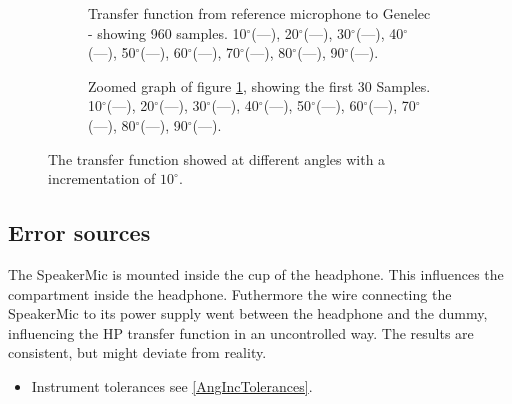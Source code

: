 \begin{figure}[H]
	\centering
	\begin{subfigure}[b]{\textwidth}
	
	\caption{Transfer function from reference microphone to Genelec - showing 960 samples.
		10$^\circ$(\textcolor{MATLABblue}{---}), 
		20$^\circ$(\textcolor{MATLABorange}{---}), 	
		30$^\circ$(\textcolor{MATLAByellow}{---}), 	
		40$^\circ$(\textcolor{MATLABpurple}{---}), 	
		50$^\circ$(\textcolor{MATLABgreen}{---}), 	
		60$^\circ$(\textcolor{MATLABbabyblue}{---}), 	
		70$^\circ$(\textcolor{MATLABred}{---}), 	
		80$^\circ$(\textcolor{MATLABblue}{---}), 	
		90$^\circ$(\textcolor{MATLABorange}{---}).			
		}
	\label{Fig:AngOfIncTime}
	\end{subfigure} 
	\begin{subfigure}[b]{\textwidth}
	
	\caption{Zoomed graph of figure \ref{Fig:AngOfIncTime}, showing the first 30 Samples.
		10$^\circ$(\textcolor{MATLABblue}{---}), 
		20$^\circ$(\textcolor{MATLABorange}{---}), 	
		30$^\circ$(\textcolor{MATLAByellow}{---}), 	
		40$^\circ$(\textcolor{MATLABpurple}{---}), 	
		50$^\circ$(\textcolor{MATLABgreen}{---}), 	
		60$^\circ$(\textcolor{MATLABbabyblue}{---}), 	
		70$^\circ$(\textcolor{MATLABred}{---}), 	
		80$^\circ$(\textcolor{MATLABblue}{---}), 	
		90$^\circ$(\textcolor{MATLABorange}{---}).			
		}
	\label{Fig:AngOfIncTimezoom2}
	\end{subfigure}
	\caption{The transfer function showed at different angles with a incrementation of $10^{\circ}$.}
	\label{fig:AngOfIncResult}
\end{figure}

\subsection{Error sources}
The SpeakerMic is mounted inside the cup of the headphone. This influences the compartment inside the headphone. Futhermore the wire connecting the SpeakerMic to its power supply went between the headphone and the dummy, influencing the HP transfer function in an uncontrolled way. The results are consistent, but might deviate from reality.

\begin{itemize}
	\item Instrument tolerances see \autoref{AngIncTolerances}.
\end{itemize}

